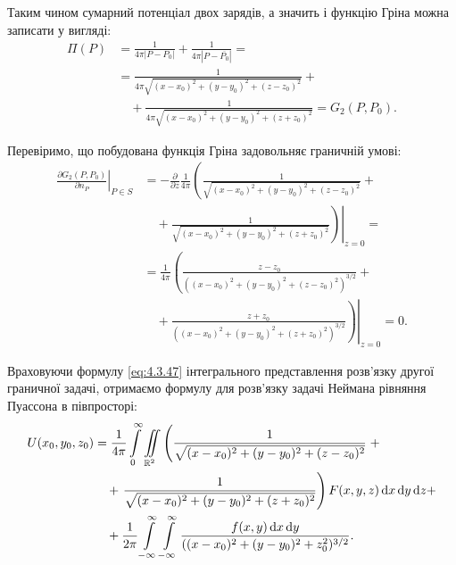 Таким чином сумарний потенціал двох зарядів, а значить і функцію Гріна можна записати у вигляді:
\begin{equation}
	\begin{aligned}
		\Pi(P) &= \frac{1}{4 \pi |P - P_0|} + \frac{1}{4 \pi |P - \overline{P_0}|} = \\
		& = \frac{1}{4 \pi \sqrt{(x - x_0)^2 + (y - y_0)^2 + (z - z_0)^2}} + \\
		& \quad + \frac{1}{4 \pi \sqrt{(x - x_0)^2 + (y - y_0)^2 + (z + z_0)^2}} = G_2(P, P_0).
	\end{aligned}
\end{equation}

Перевіримо, що побудована функція Гріна задовольняє граничній умові:
\begin{equation}
	\begin{aligned}
		\left. \frac{\partial G_2(P, P_0)}{\partial n_P} \right|_{P \in S} &= - \frac{\partial}{\partial z} \frac{1}{4 \pi} \left( \frac{1}{\sqrt{(x - x_0)^2 + (y - y_0)^2 + (z - z_0)^2}} \right. + \\
		& \quad + \left. \left. \frac{1}{\sqrt{(x - x_0)^2 + (y - y_0)^2 + (z + z_0)^2}} \right) \right|_{z = 0} = \\
		& = \frac{1}{4 \pi} \left( \frac{z - z_0}{((x - x_0)^2 + (y - y_0)^2 + (z - z_0)^2)^{3/2}} \right. + \\
		& \quad + \left. \left. \frac{z + z_0}{((x - x_0)^2 + (y - y_0)^2 + (z + z_0)^2)^{3/2}} \right) \right|_{z = 0} = 0.
	\end{aligned}
\end{equation}

Враховуючи формулу \eqref{eq:4.3.47} інтегрального представлення розв'язку другої граничної задачі, отримаємо формулу для розв'язку задачі Неймана рівняння Пуассона в півпросторі:
\begin{equation}
	\begin{aligned}
		U(x_0, y_0, z_0) &= \frac{1}{4 \pi} \displaystyle\int\limits_0^\infty \displaystyle\iint\limits_{\mathbb{R}^2} \left( \frac{1}{\sqrt{(x - x_0)^2 + (y - y_0)^2 + (z - z_0)^2}} \right. + \\
		& \quad + \left. \frac{1}{\sqrt{(x - x_0)^2 + (y - y_0)^2 + (z + z_0)^2}} \right) F(x, y, z) \mathop{}\!\mathrm{d} x \mathop{}\!\mathrm{d} y \mathop{}\!\mathrm{d} z + \\
		& \quad + \frac{1}{2 \pi} \displaystyle\int\limits_{-\infty}^\infty \displaystyle\int\limits_{-\infty}^\infty \frac{f(x, y) \mathop{}\!\mathrm{d} x \mathop{}\!\mathrm{d} y}{((x - x_0)^2 + (y - y_0)^2 + z_0^2)^{3/2}}.
	\end{aligned}
\end{equation}